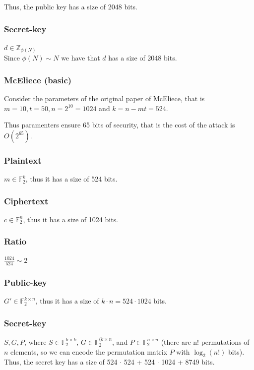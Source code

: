 \noindent
Thus, the public key has a size of 2048 bits.

\subsubsection *{Secret-key}
$d \in \mathbb{Z}_{\phi(N)}$\\
Since $\phi(N) \sim N$ we have that $d$ has a size of 2048 bits.

\subsubsection{McEliece (basic)}
Consider the parameters of the original paper of McEliece, that is $m = 10, t = 50, n = 2^{10} = 1024$ and $k = n - mt = 524$.
\medskip

\noindent
Thus paramenters ensure 65 bits of security, that is the cost of the attack is $O(2^{65})$.

\subsubsection*{Plaintext} 
$m \in \mathbb{F}_2^k$, thus it has a size of 524 bits.

\subsubsection*{Ciphertext} 
$c \in \mathbb{F}_2^n$, thus it has a size of 1024 bits.

\subsubsection*{Ratio} 
$\frac{1024}{524} \sim 2$

\subsubsection*{Public-key} 
$G' \in \mathbb{F}_2^{k \times n}$, thus it has a size of $k \cdot n = 524 \cdot 1024$ bits.

\subsubsection*{Secret-key}
$S, G, P$, where $S \in \mathbb{F}_2^{k \times k}$, $G \in \mathbb{F}_2^{(k \times n}$, and $P \in \mathbb{F}_2^{n \times n}$ (there are n! permutations of $n$ elements, so we can encode the permutation matrix $P$ with $\log_2(n!)$ bits).\\
Thus, the secret key has a size of 524 $\cdot$ 524 + 524 $\cdot$ 1024 + 8749 bits.

